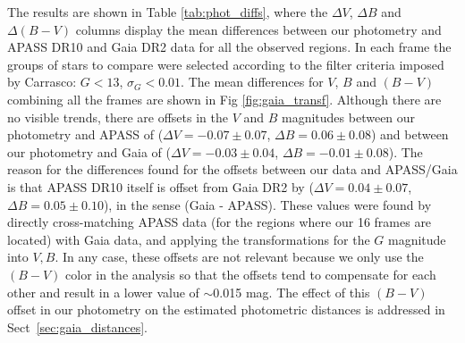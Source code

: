 \documentclass[draft]{aa}
\begin{document}
The results are shown in Table \ref{tab:phot_diffs}, where the $\Delta V$,
$\Delta B$ and $\Delta (B-V)$ columns display the mean differences
between our photometry and APASS DR10 and Gaia DR2 data for all the observed
regions.
%
In each frame the groups of stars to compare were selected according
to the filter criteria imposed by Carrasco: $G<13$, $\sigma_{G}<0.01$.
%
The mean differences for $V$, $B$ and $(B-V)$ combining all
the frames are shown in Fig \ref{fig:gaia_transf}. Although there are no
visible trends, there are offsets in the $V$ and $B$ magnitudes between our
photometry and APASS of ($\Delta V=-0.07\pm0.07$, $\Delta B=0.06\pm0.08$) and
between our photometry and Gaia of ($\Delta V=-0.03\pm0.04$,
$\Delta B=-0.01\pm0.08$).
%
The reason for the differences found for the offsets between our data and
APASS/Gaia is that APASS DR10 itself is offset from Gaia
DR2 by ($\Delta V=0.04\pm0.07$, $\Delta B=0.05\pm0.10$), in the sense (Gaia -
APASS).
These values were found by directly cross-matching APASS data (for the regions where
our 16 frames are located) with Gaia data, and applying the
transformations for the $G$ magnitude into $V,B$.
%
In any case, these offsets are not relevant because we only use the $(B-V)$
color in the analysis so that the offsets tend to compensate for each other
and result in a lower value of $\sim$0.015 mag.
The effect of this $(B-V)$ offset in our photometry on the estimated
photometric distances is addressed in Sect~\ref{sec:gaia_distances}.\\
\end{document}
